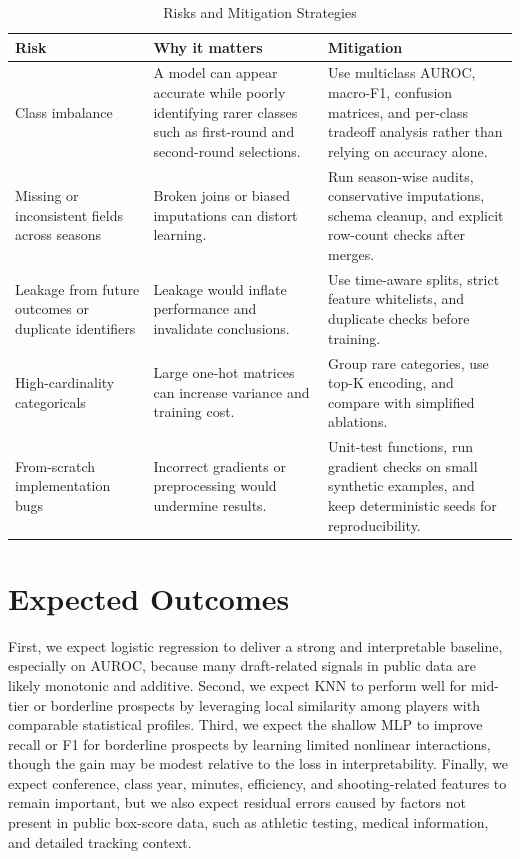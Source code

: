 \begin{table}[t]
\centering
\small
\caption{Risks and Mitigation Strategies}
\label{tab:risks}
\begin{tabularx}{\textwidth}{|l|X|X|}
\hline
\textbf{Risk} & \textbf{Why it matters} & \textbf{Mitigation} \\
\hline

Class imbalance 
& A model can appear accurate while poorly identifying rarer classes such as first-round and second-round selections. 
& Use multiclass AUROC, macro-F1, confusion matrices, and per-class tradeoff analysis rather than relying on accuracy alone. \\
\hline

Missing or inconsistent fields across seasons 
& Broken joins or biased imputations can distort learning. 
& Run season-wise audits, conservative imputations, schema cleanup, and explicit row-count checks after merges. \\
\hline

Leakage from future outcomes or duplicate identifiers 
& Leakage would inflate performance and invalidate conclusions. 
& Use time-aware splits, strict feature whitelists, and duplicate checks before training. \\
\hline

High-cardinality categoricals 
& Large one-hot matrices can increase variance and training cost. 
& Group rare categories, use top-K encoding, and compare with simplified ablations. \\
\hline

From-scratch implementation bugs 
& Incorrect gradients or preprocessing would undermine results. 
& Unit-test functions, run gradient checks on small synthetic examples, and keep deterministic seeds for reproducibility. \\
\hline

\end{tabularx}
\end{table}

\section{Expected Outcomes }

First, we expect logistic regression to deliver a strong and interpretable baseline, especially on AUROC, because many draft-related signals in public data are likely monotonic and additive.
Second, we expect KNN to perform well for mid-tier or borderline prospects by leveraging local similarity among players with comparable statistical profiles.
Third, we expect the shallow MLP to improve recall or F1 for borderline prospects by learning limited nonlinear interactions, though the gain may be modest relative to the loss in interpretability.
Finally, we expect conference, class year, minutes, efficiency, and shooting-related features to remain important, but we also expect residual errors caused by factors not present in public box-score data, such as athletic testing, medical information, and detailed tracking context.


